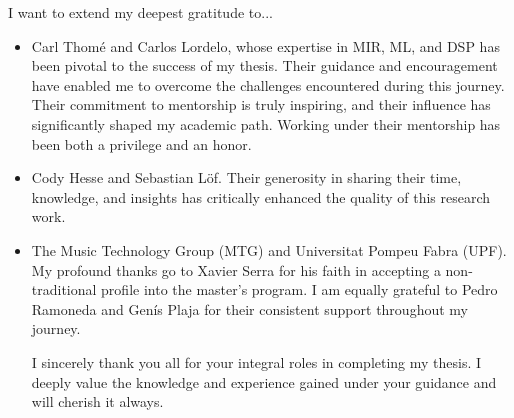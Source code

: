 

\begin{acknowledgement}

I want to extend my deepest gratitude to...

\begin{itemize}
\item Carl Thomé and Carlos Lordelo, whose expertise in MIR, ML, and DSP has been pivotal to the success of my thesis. Their guidance and encouragement have enabled me to overcome the challenges encountered during this journey. Their commitment to mentorship is truly inspiring, and their influence has significantly shaped my academic path. 
Working under their mentorship has been both a privilege and an honor.

\vspace*{3mm}
\item Cody Hesse and Sebastian Löf. Their generosity in sharing their time, knowledge, and insights has critically enhanced the quality of this research work.

\vspace*{3mm}
\item The Music Technology Group (MTG) and Universitat Pompeu Fabra (UPF). My profound thanks go to Xavier Serra for his faith in accepting a non-traditional profile into the master's program. I am equally grateful to Pedro Ramoneda and Genís Plaja for their consistent support throughout my journey.

\vspace*{3mm}

I sincerely thank you all for your integral roles in completing my thesis. I deeply value the knowledge and experience gained under your guidance and will cherish it always.

\vspace*{3mm}
\end{itemize}

\newpage
\end{acknowledgement}